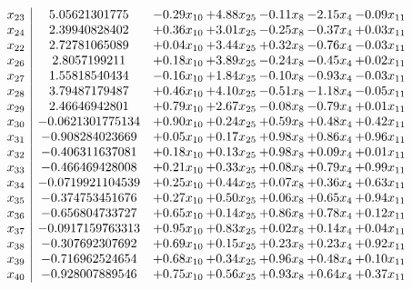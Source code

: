 \documentclass[8pt]{article}
\begin{document}
\[\begin{array}{c| c c@{\hskip 2pt} c@{\hskip 2pt} c@{\hskip 2pt} c@{\hskip 2pt} c@{\hskip 2pt} }
 x_{23}   &  5.05621301775 & -0.29 x_{10} & +  4.88 x_{25} & -0.11 x_{8} & -2.15 x_{4} & -0.09 x_{11}\\
 x_{24}   &  2.39940828402 & +  0.36 x_{10} & +  3.01 x_{25} & -0.25 x_{8} & -0.37 x_{4} & +  0.03 x_{11}\\
 x_{22}   &  2.72781065089 & +  0.04 x_{10} & +  3.44 x_{25} & +  0.32 x_{8} & -0.76 x_{4} & -0.03 x_{11}\\
 x_{26}   &  2.8057199211 & +  0.18 x_{10} & +  3.89 x_{25} & -0.24 x_{8} & -0.45 x_{4} & +  0.02 x_{11}\\
 x_{27}   &  1.55818540434 & -0.16 x_{10} & +  1.84 x_{25} & -0.10 x_{8} & -0.93 x_{4} & -0.03 x_{11}\\
 x_{28}   &  3.79487179487 & +  0.46 x_{10} & +  4.10 x_{25} & -0.51 x_{8} & -1.18 x_{4} & -0.05 x_{11}\\
 x_{29}   &  2.46646942801 & +  0.79 x_{10} & +  2.67 x_{25} & -0.08 x_{8} & -0.79 x_{4} & +  0.01 x_{11}\\
 x_{30}   &  -0.0621301775134 & +  0.90 x_{10} & +  0.24 x_{25} & +  0.59 x_{8} & +  0.48 x_{4} & +  0.42 x_{11}\\
 x_{31}   &  -0.908284023669 & +  0.05 x_{10} & +  0.17 x_{25} & +  0.98 x_{8} & +  0.86 x_{4} & +  0.96 x_{11}\\
 x_{32}   &  -0.406311637081 & +  0.18 x_{10} & +  0.13 x_{25} & +  0.98 x_{8} & +  0.09 x_{4} & +  0.01 x_{11}\\
 x_{33}   &  -0.466469428008 & +  0.21 x_{10} & +  0.33 x_{25} & +  0.08 x_{8} & +  0.79 x_{4} & +  0.99 x_{11}\\
 x_{34}   &  -0.0719921104539 & +  0.25 x_{10} & +  0.44 x_{25} & +  0.07 x_{8} & +  0.36 x_{4} & +  0.63 x_{11}\\
 x_{35}   &  -0.374753451676 & +  0.27 x_{10} & +  0.50 x_{25} & +  0.06 x_{8} & +  0.65 x_{4} & +  0.94 x_{11}\\
 x_{36}   &  -0.656804733727 & +  0.65 x_{10} & +  0.14 x_{25} & +  0.86 x_{8} & +  0.78 x_{4} & +  0.12 x_{11}\\
 x_{37}   &  -0.0917159763313 & +  0.95 x_{10} & +  0.83 x_{25} & +  0.02 x_{8} & +  0.14 x_{4} & +  0.04 x_{11}\\
 x_{38}   &  -0.307692307692 & +  0.69 x_{10} & +  0.15 x_{25} & +  0.23 x_{8} & +  0.23 x_{4} & +  0.92 x_{11}\\
 x_{39}   &  -0.716962524654 & +  0.68 x_{10} & +  0.34 x_{25} & +  0.96 x_{8} & +  0.48 x_{4} & +  0.10 x_{11}\\
 x_{40}   &  -0.928007889546 & +  0.75 x_{10} & +  0.56 x_{25} & +  0.93 x_{8} & +  0.64 x_{4} & +  0.37 x_{11}\\

\end{array}\]
\end{document}
